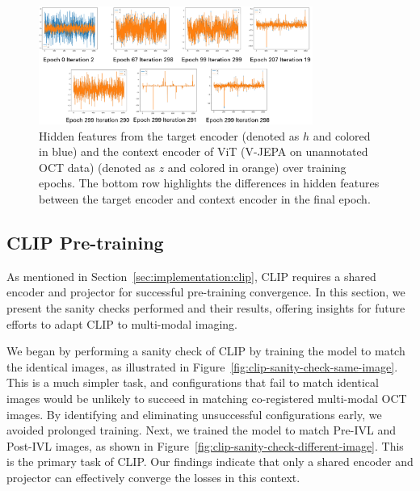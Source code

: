\documentclass[a4paper,11pt,oneside]{report}
\begin{document}
\begin{figure}[hbt]
    \centering
    \includegraphics[width=0.8\textwidth]{figures/discussion_vjepa_prediction.png}
    \caption{Hidden features from the target encoder (denoted as \(h\) and colored in blue) and the context encoder of ViT (V-JEPA on unannotated OCT data) (denoted as \(z\) and colored in orange) over training epochs. The bottom row highlights the differences in hidden features between the target encoder and context encoder in the final epoch.}
    \label{fig:v-jepa-prediction}
\end{figure}

\subsection{CLIP Pre-training}\label{sec:results:discussion:clip}
As mentioned in Section~\ref{sec:implementation:clip}, CLIP requires a shared encoder and projector for successful pre-training convergence. In this section, we present the sanity checks performed and their results, offering insights for future efforts to adapt CLIP to multi-modal imaging.

We began by performing a sanity check of CLIP by training the model to match the identical images, as illustrated in Figure~\ref{fig:clip-sanity-check-same-image}. This is a much simpler task, and configurations that fail to match identical images would be unlikely to succeed in matching co-registered multi-modal OCT images. By identifying and eliminating unsuccessful configurations early, we avoided prolonged training. Next, we trained the model to match Pre-IVL and Post-IVL images, as shown in Figure~\ref{fig:clip-sanity-check-different-image}. This is the primary task of CLIP. Our findings indicate that only a shared encoder and projector can effectively converge the losses in this context.
\end{document}
